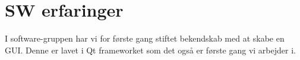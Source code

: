 \section{SW erfaringer}

I software-gruppen har vi for første gang stiftet bekendskab med at skabe en GUI. Denne er lavet i Qt frameworket som det også er første gang vi arbejder i.